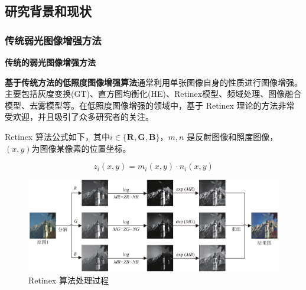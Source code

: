 \documentclass[CJK,aspectratio=169]{beamer}  %
\begin{document}
	\subsection{研究背景和现状}
	
	\subsubsection{传统弱光图像增强方法}
	
	\begin{frame}
		{ \yahei \textbf{传统的弱光图像增强方法}}
		
		{ \yahei \textbf{基于传统方法的低照度图像增强算法}通常利用单张图像自身的性质进行图像增强。主要包括灰度变换(GT)\textcolor{blue}{\citep{ueng1995gamma}}、直方图均衡化(HE)\textcolor{blue}{\citep{stark2000adaptive}}、Retinex模型\textcolor{blue}{\citep{land1971lightness}}、频域处理\textcolor{blue}{\citep{liu2021benchmarking}}、图像融合模型\textcolor{blue}{\citep{dai2019fractional}}、去雾模型\textcolor{blue}{\citep{ma2019improved}}等。在低照度图像增强的领域中，基于 Retinex 理论的方法非常受欢迎，并且吸引了众多研究者的关注。}
		
		\vspace{0.2cm}
		
		{ \yahei  Retinex 算法公式如下，其中$i \in \{\mathbf{R, G, B}\}$，$m,n$ 是反射图像和照度图像，$(x,y)$为图像某像素的位置坐标。}
		
		{ \yahei $$z_i\left(x,y\right) = m_i\left(x,y\right) \cdot n_i\left(x,y\right)$$}
				
		\vspace{0.1cm}
		
		\begin{figure}
			\centering 
			\includegraphics[width=0.5\columnwidth]{picture/LLIE/Retinex Model/Retinex Model}
			\caption{
				\label{fig: Retinex model} 
				\tiny Retinex 算法处理过程
			}
		\end{figure}
	\end{frame}
	
\end{document}
